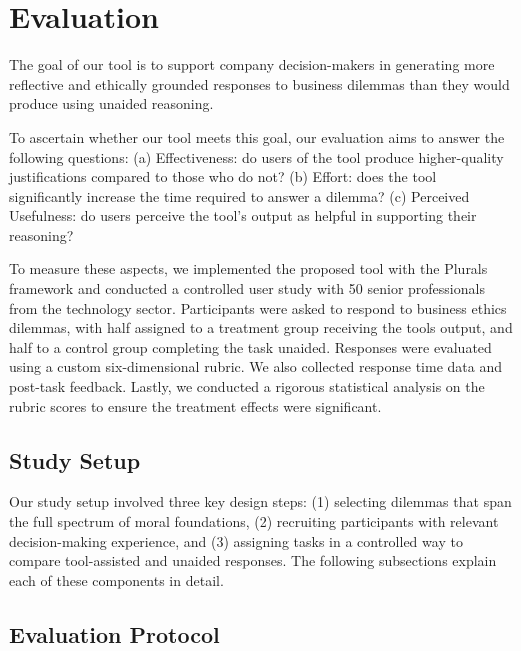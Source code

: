 \section{Evaluation}

The goal of our tool is to support company decision-makers in generating more reflective and ethically grounded responses to business dilemmas than they would produce using unaided reasoning.

To ascertain whether our tool meets this goal, our evaluation aims to answer the following questions:
(a) Effectiveness: do users of the tool produce higher-quality justifications compared to those who do not?
(b) Effort: does the tool significantly increase the time required to answer a dilemma?
(c) Perceived Usefulness: do users perceive the tool's output as helpful in supporting their reasoning?

To measure these aspects, we implemented the proposed tool with the Plurals framework and conducted a controlled user study with 50 senior professionals from the technology sector. Participants were asked to respond to business ethics dilemmas, with half assigned to a treatment group receiving the tools output, and half to a control group completing the task unaided. Responses were evaluated using a custom six-dimensional rubric. We also collected response time data and post-task feedback. Lastly, we conducted a rigorous statistical analysis on the rubric scores to ensure the treatment effects were significant.



\subsection{Study Setup}

Our study setup involved three key design steps: (1) selecting dilemmas that span the full spectrum of moral foundations, (2) recruiting participants with relevant decision-making experience, and (3) assigning tasks in a controlled way to compare tool-assisted and unaided responses. The following subsections explain each of these components in detail.





\subsection{Evaluation Protocol}

